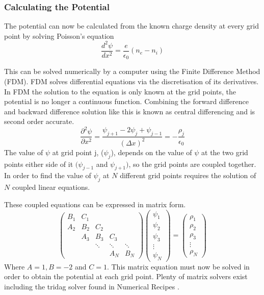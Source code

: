 \documentclass[12pt]{article}
\def\be{\begin{equation}}
\def\ee{\end{equation}}
\begin{document}
\subsubsection{Calculating the Potential}
The potential can now be calculated from the known charge density at every grid point by solving Poisson's equation
\be
\frac{d^2 \psi}{dx^2} = \frac{e}{\epsilon_0} (n_e - n_i)
\ee 

This can be solved numerically by a computer using the Finite Difference Method (FDM). FDM solves differential equations via the discretisation of its derivatives. 
In FDM the solution to the equation is only known at the grid points, the potential is no longer a continuous function. Combining the forward difference and backward difference solution like this is known as central differencing and is second order accurate.
\be 
\frac{{\partial}^2\psi}{\partial x^2} = \frac{\psi_{j+1} -2\psi_{j} + \psi_{j-1}}{{(\Delta x)}^2} = -\frac{\rho_j}{\epsilon_0}
\label{eq:phisolver1}
\ee 
The value of $\psi$ at grid point j, ($\psi_j$),  depends on the value of $\psi$ at the two grid points either side of it $(\psi_{j-1}$ and $\psi_{j+1})$, so the grid points are coupled together. In order to find the value of $\psi_j$ at $N$ different grid points requires the solution of $N$ coupled linear equations. 


These coupled equations can be expressed in matrix form. 
\be
\begin{pmatrix}
  B_{1} & C_{1}  \\
  A_{2} & B_{2} & C_2 \\
        & A_3  & B_3 & C_3   \\
        & & \ddots & \ddots & \ddots \\
        & & &  A_N & B_N
\end{pmatrix}
\begin{pmatrix} 
 \psi_1  \\ 
 \psi_2  \\ 
 \psi_3  \\ 
 \vdots  \\
 \psi_N
\end{pmatrix}
= 
\begin{pmatrix} 
 \rho_1  \\ 
 \rho_2  \\ 
 \rho_3  \\ 
 \vdots  \\
 \rho_N
\end{pmatrix}
\ee
Where $A=1, B=-2$ and $C=1$.  This matrix equation must now be solved in order to obtain the potential at each grid point. Plenty of matrix solvers exist including the tridag solver found in Numerical Recipes \cite{NumericalRecipes}. 
\end{document}
